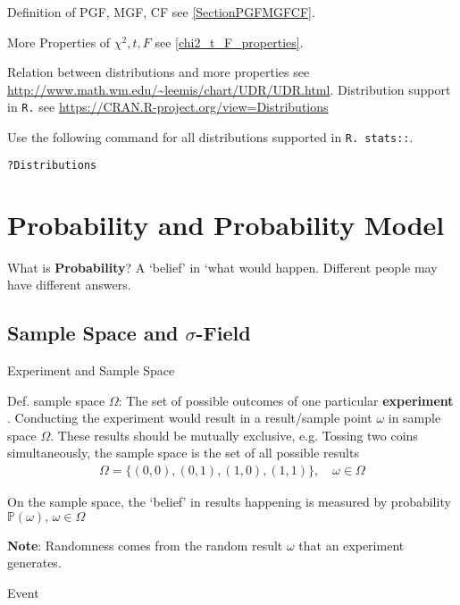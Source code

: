     Definition of PGF, MGF, CF see \autoref{SectionPGFMGFCF}.

    More Properties of $\chi^2,t,F$ see {\autoref{chi2_t_F_properties}}.

    Relation between distributions and more properties see \url{http://www.math.wm.edu/~leemis/chart/UDR/UDR.html}. Distribution support in \lstinline|R.| see \url{https://CRAN.R-project.org/view=Distributions}

Use the following command for all distributions supported in \lstinline|R. stats::|.
\begin{lstlisting}[language=R]
?Distributions
\end{lstlisting}


\section{Probability and Probability Model}

    What is \textbf{Probability}? A `belief' in `what would happen. Different people may have different answers.


\subsection{Sample Space and $\sigma$-Field}

\begin{point}
    Experiment and Sample Space
\end{point}

    Def. sample space $\Omega$: The set of  possible outcomes of one particular \textbf{experiment} . Conducting the experiment would result in a result/sample point $ \omega  $ in sample space $ \Omega  $. These results should be mutually exclusive, e.g. Tossing two coins simultaneously, the sample space is the set of all possible results
    \begin{align}
        \Omega = \{(0,0),(0,1),(1,0),(1,1)\}, \quad \omega \in \Omega 
    \end{align}

    On the sample space, the `belief' in results happening is measured by probability $ \mathbb{P}\left( \omega  \right),\,\omega \in\Omega   $

    \textbf{Note}: Randomness comes from the random result $ \omega  $ that an experiment generates.
    
\begin{point}
    Event 
\end{point}

